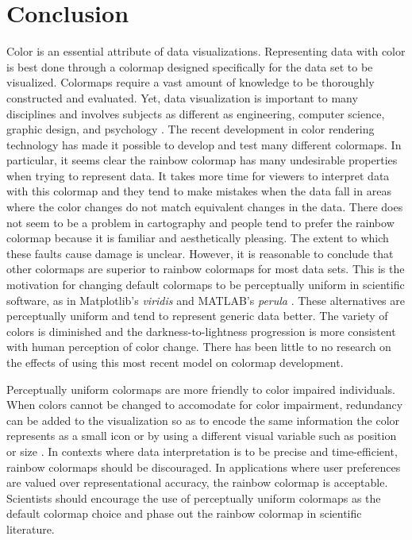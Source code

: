 \documentclass[journal,12pt]{IEEEtran}
\begin{document}
\section{Conclusion}

Color is an essential attribute of data visualizations. Representing data
with color is best done through a colormap designed specifically for the data set to be visualized.
Colormaps require a vast amount of knowledge to be thoroughly constructed and evaluated. Yet,
data visualization is important to many disciplines and involves subjects
as different as engineering, computer science, graphic design,
and psychology \cite{choropleth}. The recent development in color rendering technology has made it 
possible to develop and test many different colormaps. In particular, it seems clear
the rainbow colormap has many undesirable properties when trying to represent data.
It takes more time for viewers to interpret data with this colormap and they tend to
make mistakes when the data fall in areas where the color changes do not match 
equivalent changes in the data. There does not seem to be a problem in cartography
and people tend to prefer the rainbow colormap because it is familiar and aesthetically pleasing.
The extent to which these faults cause damage is unclear. However, it is reasonable to conclude
that other colormaps are superior to rainbow colormaps for most data sets.
This is the motivation for changing default colormaps to be perceptually uniform
in scientific software, as in Matplotlib's \textit{viridis} and MATLAB's \textit{perula} \cite{viridis,matlab}.
These alternatives are perceptually uniform and tend to represent generic data better.
The variety of colors is diminished and the darkness-to-lightness progression
is more consistent with human perception of color change.
There has been little to no research on the effects of using this most recent model on colormap
development.

Perceptually uniform colormaps are more friendly to color
impaired individuals. When colors cannot be changed
to accomodate for color impairment, redundancy can be added to the visualization
so as to encode the same information the color represents as a small icon or by using
a different visual variable such as position or size \cite{tufte}. In contexts where data
interpretation is to be precise and time-efficient, rainbow colormaps should be discouraged.
In applications where user preferences are valued over representational accuracy,
the rainbow colormap is acceptable. Scientists should 
encourage the use of perceptually uniform colormaps as the default colormap choice and phase out the rainbow colormap
in scientific literature.


\newpage



\end{document}
